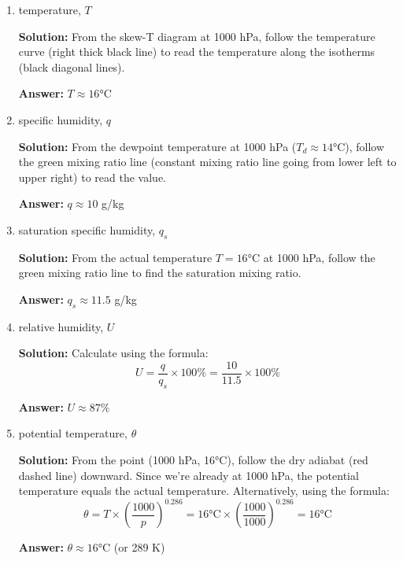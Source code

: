 \documentclass[letterpaper, 11pt]{article}
\newcommand{\1}{\mathds{1}}	%
\theoremstyle{definition}
\begin{document}
\begin{enumerate}[label=(\alph*)]
    \item temperature, $T$
    
    \textbf{Solution:} From the skew-T diagram at 1000 hPa, follow the temperature curve (right thick black line) to read the temperature along the isotherms (black diagonal lines).
    
    \textbf{Answer:} $T \approx 16°\text{C}$
    
    \item specific humidity, $q$
    
    \textbf{Solution:} From the dewpoint temperature at 1000 hPa ($T_d \approx 14°\text{C}$), follow the green mixing ratio line (constant mixing ratio line going from lower left to upper right) to read the value.
    
    \textbf{Answer:} $q \approx 10$ g/kg
    
    \item saturation specific humidity, $q_s$
    
    \textbf{Solution:} From the actual temperature $T = 16°\text{C}$ at 1000 hPa, follow the green mixing ratio line to find the saturation mixing ratio.
    
    \textbf{Answer:} $q_s \approx 11.5$ g/kg
    
    \item relative humidity, $U$
    
    \textbf{Solution:} Calculate using the formula:
    \begin{equation}
    U = \frac{q}{q_s} \times 100\% = \frac{10}{11.5} \times 100\%
    \end{equation}
    
    \textbf{Answer:} $U \approx 87\%$
    
    \item potential temperature, $\theta$
    
    \textbf{Solution:} From the point (1000 hPa, 16°C), follow the dry adiabat (red dashed line) downward. Since we're already at 1000 hPa, the potential temperature equals the actual temperature. Alternatively, using the formula:
    \begin{equation}
    \theta = T \times \left(\frac{1000}{p}\right)^{0.286} = 16°\text{C} \times \left(\frac{1000}{1000}\right)^{0.286} = 16°\text{C}
    \end{equation}
    
    \textbf{Answer:} $\theta \approx 16°\text{C}$ (or 289 K)
    

\end{enumerate}
\end{document}
